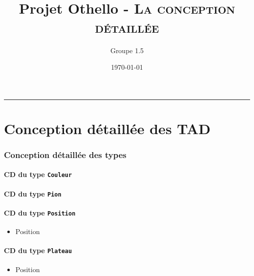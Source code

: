 \documentclass[11pt]{article}
\title{Projet Othello - \textsc{La conception détaillée}}
\author{Groupe 1.5}
\date{\today}
\begin{document}
\maketitle
\noindent\rule{\textwidth}{1.3pt}

\renewcommand{\tt}[1]{\og \texttt{#1} \fg}

\part{Conception détaillée des TAD}

\section{Conception détaillée des types}

\subsection{CD du type \tt{Couleur}}
\begin{itemize}
\end{itemize}

\subsection{CD du type \tt{Pion}}
\begin{itemize}
\end{itemize}

\subsection{CD du type \tt{Position}}
\begin{itemize}
\item
\begin{algorithme}
\begin{enregistrement}{Position}
\end{enregistrement}
\end{algorithme} 
\end{itemize}

\subsection{CD du type \tt{Plateau}}
\begin{itemize}
\item
\begin{algorithme}
\begin{enregistrement}{Position}
\end{enregistrement}
\end{algorithme} 
\end{itemize}
\end{document}
